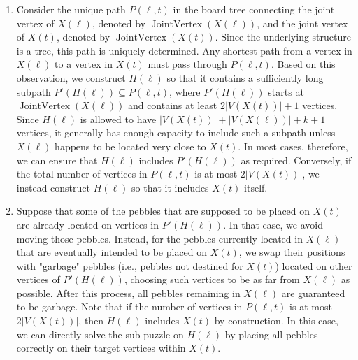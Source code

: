 \documentclass[letter,11pt]{article}
\theoremstyle{definition}
\theoremstyle{definition}
\DeclareMathOperator{\JoiV}{JointVertex}
\newcommand{\1}{\boldmath$~1~$\unboldmath}
\newcommand{\Ord}{\mathrm{O}}
\begin{document}
\begin{enumerate}
      \item Consider the unique path $P(\ell, t)$ in the board tree connecting the joint vertex of $X(\ell)$, denoted by $\JoiV(X(\ell))$, and the joint vertex of $X(t)$, denoted by $\JoiV(X(t))$.
Since the underlying structure is a tree, this path is uniquely determined. Any shortest path from a vertex in $X(\ell)$ to a vertex in $X(t)$ must pass through $P(\ell, t)$.
Based on this observation, we construct $H(\ell)$ so that it contains a sufficiently long subpath $P'(H(\ell)) \subseteq P(\ell, t)$, where $P'(H(\ell))$ starts at $\JoiV(X(\ell))$
and contains at least $2|V(X(t))| + 1$ vertices. Since $H(\ell)$ is allowed to have $|V(X(t))| + |V(X(\ell))| + k + 1$ vertices, it generally has enough capacity to include such a subpath
unless $X(\ell)$ happens to be located very close to $X(t)$. In most cases, therefore, we can ensure that $H(\ell)$ includes $P'(H(\ell))$ as required. Conversely, if the total number
of vertices in $P(\ell, t)$ is at most $2|V(X(t))|$, we instead construct $H(\ell)$ so that it includes $X(t)$ itself.
      \item Suppose that some of the pebbles that are supposed to be placed on $X(t)$ are already located on vertices in $P'(H(\ell))$. In that case, we avoid moving those pebbles.
Instead, for the pebbles currently located in $X(\ell)$ that are eventually intended to be placed on $X(t)$, we swap their positions with "garbage" pebbles (i.e., pebbles not
destined for $X(t)$) located on other vertices of $P'(H(\ell))$, choosing such vertices to be as far from $X(\ell)$ as possible. After this process, all pebbles remaining in $X(\ell)$
are guaranteed to be garbage. Note that if the number of vertices in $P(\ell, t)$ is at most $2|V(X(t))|$, then $H(\ell)$ includes $X(t)$ by construction. In this case, we can directly
solve the sub-puzzle on $H(\ell)$ by placing all pebbles correctly on their target vertices within $X(t)$.
\end{enumerate}

\end{document}

